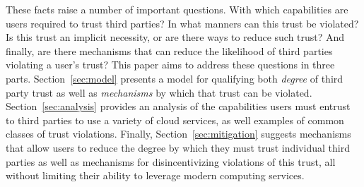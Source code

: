 These facts raise a number of important questions. With which
capabilities are users required to trust third parties? In what
manners can this trust be violated? Is this trust an implicit
necessity, or are there ways to reduce such trust? And finally, are
there mechanisms that can reduce the likelihood of third parties
violating a user's trust? This paper aims to address these questions
in three parts. Section~\ref{sec:model} presents a model for
qualifying both \emph{degree} of third party trust as well as
\emph{mechanisms} by which that trust can be violated.
Section~\ref{sec:analysis} provides an analysis of the capabilities
users must entrust to third parties to use a variety of cloud
services, as well examples of common classes of trust
violations. Finally, Section~\ref{sec:mitigation} suggests mechanisms
that allow users to reduce the degree by which they must trust
individual third parties as well as mechanisms for disincentivizing
violations of this trust, all without limiting their ability to
leverage modern computing services.
